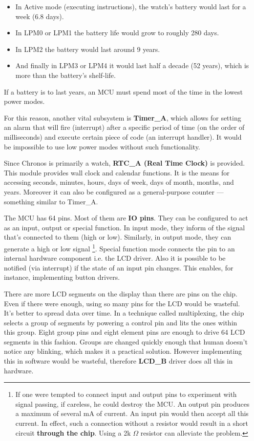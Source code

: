 \begin{itemize}
    \item In Active mode (executing instructions), the watch's battery
      would last for a week (6.8 days).
    \item In LPM0 or LPM1 the battery life would grow to roughly 280 days.
    \item In LPM2 the battery would last around 9 years.
    \item And finally in LPM3 or LPM4 it would last half a decade (52
    years), which is more than the battery's shelf-life.
\end{itemize}
If a battery is to last years, an MCU must spend most of the time in
the lowest power modes.

For this reason, another vital subsystem is {\bf Timer\_A}, which
allows for setting an alarm that will fire (interrupt) after a specific
period of time (on the order of milliseconds) and execute certain
piece of code (an interrupt handler). It would be impossible to use low
power modes without such functionality.

Since Chronos is primarily a watch, {\bf RTC\_A (Real Time Clock)} is
provided. This module provides wall clock and calendar functions. It
is the means for accessing seconds, minutes, hours, days of week, days
of month, months, and years.  Moreover it can also be configured as a
general-purpose counter --- something similar to Timer\_A.

The MCU has 64 pins. Most of them are {\bf IO pins}. They can be
configured to act as an input, output or special function.  In input
mode, they inform of the signal that's connected to them (high or
low). Similarly, in output mode, they can generate a high or low
signal \footnote{If one were tempted to connect input and output pins
to experiment with signal passing, if careless, he could destroy the
MCU.  An output pin produces a maximum of several mA of current. An
input pin would then accept all this current. In effect, such a
connection without a resistor would result in a short circuit {\bf
through the chip}. Using a 2k $\Omega$ resistor can alleviate the
problem.}. Special function mode connects the pin to an internal
hardware component i.e.  the LCD driver.  Also it is possible to be
notified (via interrupt) if the state of an input pin changes.  This
enables, for instance, implementing button drivers.

There are more LCD segments on the display than there are pins on the
chip. Even if there were enough, using so many pins for the LCD would
be wasteful. It's better to spread data over time. In a technique
called multiplexing, the chip selects a group of segments by powering
a control pin and lits the ones within this group. Eight group pins
and eight element pins are enough to drive 64 LCD segments in this
fashion. Groups are changed quickly enough that human doesn't notice
any blinking, which makes it a practical solution.  However
implementing this in software would be wasteful, therefore {\bf LCD\_B}
driver does all this in hardware.

